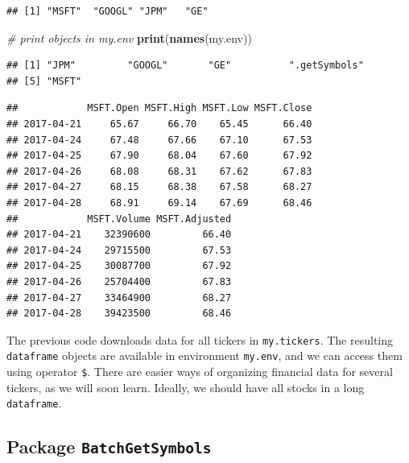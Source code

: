 \documentclass[11pt,]{book}
\newenvironment{Shaded}{\begin{snugshade}}{\end{snugshade}}
\newcommand{\KeywordTok}[1]{\textcolor[rgb]{0.27,0.27,0.27}{\textbf{#1}}}
\newcommand{\CommentTok}[1]{\textcolor[rgb]{0.56,0.35,0.01}{\textit{#1}}}
\newcommand{\OperatorTok}[1]{\textcolor[rgb]{0.81,0.36,0.00}{\textbf{#1}}}
\newcommand{\NormalTok}[1]{#1}
\begin{document}
\begin{verbatim}
## [1] "MSFT"  "GOOGL" "JPM"   "GE"
\end{verbatim}

\begin{Shaded}
\begin{Highlighting}[]
\CommentTok{# print objects in my.env}
\KeywordTok{print}\NormalTok{(}\KeywordTok{names}\NormalTok{(my.env))}
\end{Highlighting}
\end{Shaded}

\begin{verbatim}
## [1] "JPM"         "GOOGL"       "GE"          ".getSymbols"
## [5] "MSFT"
\end{verbatim}

\begin{Shaded}
\end{Shaded}

\begin{verbatim}
##            MSFT.Open MSFT.High MSFT.Low MSFT.Close
## 2017-04-21     65.67     66.70    65.45      66.40
## 2017-04-24     67.48     67.66    67.10      67.53
## 2017-04-25     67.90     68.04    67.60      67.92
## 2017-04-26     68.08     68.31    67.62      67.83
## 2017-04-27     68.15     68.38    67.58      68.27
## 2017-04-28     68.91     69.14    67.69      68.46
##            MSFT.Volume MSFT.Adjusted
## 2017-04-21    32390600         66.40
## 2017-04-24    29715500         67.53
## 2017-04-25    30087700         67.92
## 2017-04-26    25704400         67.83
## 2017-04-27    33464900         68.27
## 2017-04-28    39423500         68.46
\end{verbatim}

The previous code downloads data for all tickers in \texttt{my.tickers}.
The resulting \texttt{dataframe} objects are available in environment
\texttt{my.env}, and we can access them using operator \texttt{\$}.
There are easier ways of organizing financial data for several tickers,
as we will soon learn. Ideally, we should have all stocks in a long
\texttt{dataframe}.

\subsection{\texorpdfstring{Package
\texttt{BatchGetSymbols}}{Package BatchGetSymbols}}\label{package-batchgetsymbols}
\end{document}
